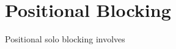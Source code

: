 \section*{Positional Blocking}
\label{sec:solo_blocking/positional}


Positional solo blocking involves 
